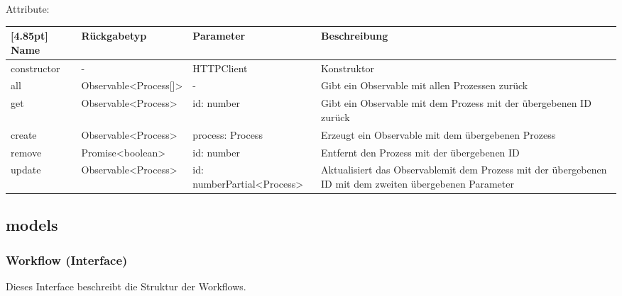 			Attribute:
			\begin{center}
			\setlength\tabcolsep{5pt}
				\renewcommand{\arraystretch}{1.5}
					\begin{tabularx}{\textwidth}{|l|l|p{30mm}|X|}
					\hline
					\rowcolor[gray]{0.75}[4.85pt]
					Name & Rückgabetyp & Parameter & Beschreibung \\ \hline 
					constructor & - & HTTPClient & Konstruktor \\ \hline
					all & Observable<Process[]> & - & Gibt ein Observable mit allen Prozessen zurück \\ \hline
					get & Observable<Process> & id: number & Gibt ein Observable mit dem Prozess mit der übergebenen ID zurück \\ \hline
					create & Observable<Process> & process: Process & Erzeugt ein Observable mit dem übergebenen Prozess \\ \hline
					remove & Promise<boolean>  & id: number & Entfernt den Prozess mit der übergebenen ID \\ \hline
					update & Observable<Process> & id: number\newline Partial<Process> & Aktualisiert das Observablemit dem Prozess mit der übergebenen ID mit dem zweiten übergebenen Parameter \\ \hline
				\end{tabularx}
			\end{center}
   
\newpage
		\subsection{models}
			
			\subsubsection{Workflow (Interface)}
			
			Dieses Interface beschreibt die Struktur der Workflows.\newline
			
